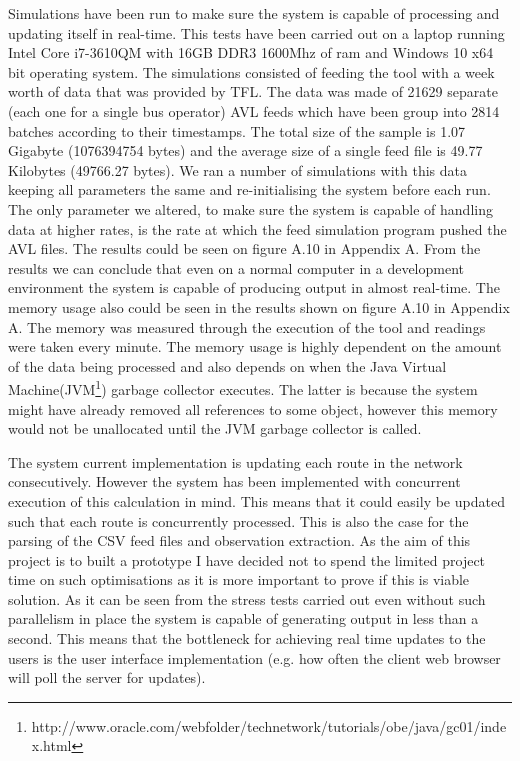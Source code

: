 Simulations have been run to make sure the system is capable of processing and updating itself in real-time. This tests have been carried out on a laptop running Intel Core i7-3610QM with 16GB DDR3 1600Mhz of ram and Windows 10 x64 bit operating system. The simulations consisted of feeding the tool with a week worth of data that was provided by TFL. The data was made of 21629 separate (each one for a single bus operator) AVL feeds which have been group into 2814 batches according to their timestamps. The total size of the sample is 1.07 Gigabyte (1076394754 bytes) and the average size of a single feed file is 49.77 Kilobytes (49766.27 bytes). We ran a number of simulations with this data keeping all parameters the same and re-initialising the system before each run. The only parameter we altered, to make sure the system is capable of handling data at higher rates, is the rate at which the feed simulation program pushed the AVL files. The results could be seen on figure A.10 in Appendix A. From the results we can conclude that even on a normal computer in a development environment the system is capable of producing output in almost real-time. The memory usage also could be seen in the results shown on figure A.10 in Appendix A. The memory was measured through the execution of the tool and readings were taken every minute. The memory usage is highly dependent on the amount of the data being processed and also depends on when the Java Virtual Machine(JVM\footnote{http://www.oracle.com/webfolder/technetwork/tutorials/obe/java/gc01/index.html}) garbage collector executes. The latter is because the system might have already removed all references to some object, however this memory would not be unallocated until the JVM garbage collector is called.

The system current implementation is updating each route in the network consecutively. However the system has been implemented with concurrent execution of this calculation in mind. This means that it could easily be updated such that each route is concurrently processed. This is also the case for the parsing of the CSV feed files and observation extraction. As the aim of this project is to built a prototype I have decided not to spend the limited project time on such optimisations as it is more important to prove if this is viable solution. As it can be seen from the stress tests carried out even without such parallelism in place the system is capable of  generating output in less than a second. This means that the bottleneck for achieving real time updates to the users is the user interface implementation (e.g. how often the client web browser will poll the server for updates).

